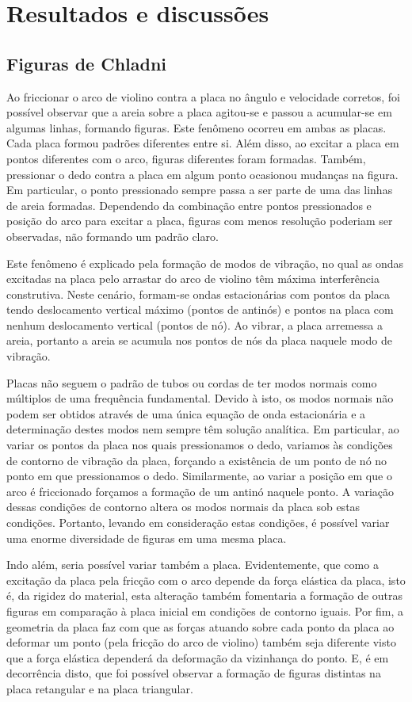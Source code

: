 \section{Resultados e discussões}
\subsection{Figuras de Chladni}

Ao friccionar o arco de violino contra a placa no ângulo e velocidade corretos, foi possível observar que a areia sobre a placa agitou-se e passou a acumular-se em algumas linhas, formando figuras. Este fenômeno ocorreu em ambas as placas. Cada placa formou padrões diferentes entre si. Além disso, ao excitar a placa em pontos diferentes com o arco, figuras diferentes foram formadas. Também, pressionar o dedo contra a placa em algum ponto ocasionou mudanças na figura. Em particular, o ponto pressionado sempre passa a ser parte de uma das linhas de areia formadas. Dependendo da combinação entre pontos pressionados e posição do arco para excitar a placa, figuras com menos resolução poderiam ser observadas, não formando um padrão claro.

Este fenômeno é explicado pela formação de modos de vibração, no qual as ondas excitadas na placa pelo arrastar do arco de violino têm máxima interferência construtiva. Neste cenário, formam-se ondas estacionárias com pontos da placa tendo deslocamento vertical máximo (pontos de antinós) e pontos na placa com nenhum deslocamento vertical (pontos de nó). Ao vibrar, a placa arremessa a areia, portanto a areia se acumula nos pontos de nós da placa naquele modo de vibração. 

Placas não seguem o padrão de tubos ou cordas de ter modos normais como múltiplos de uma frequência fundamental. Devido à isto, os modos normais não podem ser obtidos através de uma única equação de onda estacionária e a determinação destes modos nem sempre têm solução analítica. Em particular, ao variar os pontos da placa nos quais pressionamos o dedo, variamos às condições de contorno de vibração da placa, forçando a existência de um ponto de nó no ponto em que pressionamos o dedo. Similarmente, ao variar a posição em que o arco é friccionado forçamos a formação de um antinó naquele ponto. A variação dessas condições de contorno altera os modos normais da placa sob estas condições. Portanto, levando em consideração estas condições, é possível variar uma enorme diversidade de figuras em uma mesma placa. 

Indo além, seria possível variar também a placa. Evidentemente, que como a excitação da placa pela fricção com o arco depende da força elástica da placa, isto é, da rigidez do material, esta alteração também fomentaria a formação de outras figuras em comparação à placa inicial em condições de contorno iguais. Por fim, a geometria da placa faz com que as forças atuando sobre cada ponto da placa ao deformar um ponto (pela fricção do arco de violino) também seja diferente visto que a força elástica dependerá da deformação da vizinhança do ponto. E, é em decorrência disto, que foi possível observar a formação de figuras distintas na placa retangular e na placa triangular. 

